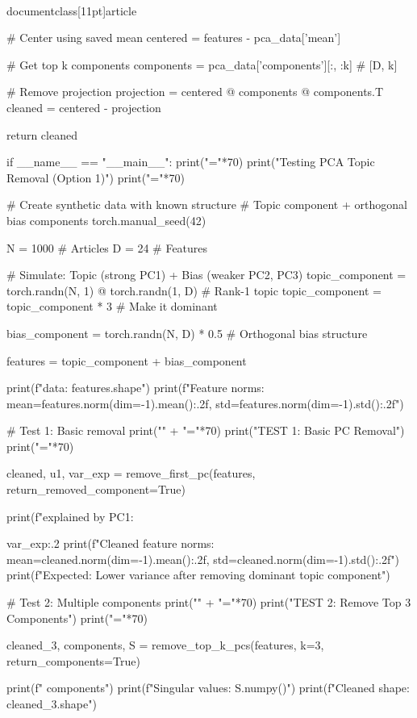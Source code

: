 \\documentclass[11pt]{article}
\begin{document}
\begin{CodeBlock}
{{    # Center using saved mean
    centered = features - pca_data['mean']
    
    # Get top k components
    components = pca_data['components'][:, :k]  # [D, k]
    
    # Remove projection
    projection = centered @ components @ components.T
    cleaned = centered - projection
    
    return cleaned


if __name__ == "__main__":
    print("="*70)
    print("Testing PCA Topic Removal (Option 1)")
    print("="*70)
    
    # Create synthetic data with known structure
    # Topic component + orthogonal bias components
    torch.manual_seed(42)
    
    N = 1000  # Articles
    D = 24    # Features
    
    # Simulate: Topic (strong PC1) + Bias (weaker PC2, PC3)
    topic_component = torch.randn(N, 1) @ torch.randn(1, D)  # Rank-1 topic
    topic_component = topic_component * 3  # Make it dominant
    
    bias_component = torch.randn(N, D) * 0.5  # Orthogonal bias structure
    
    features = topic_component + bias_component
    
    print(f"\nSynthetic data: {features.shape}")
    print(f"Feature norms: mean={features.norm(dim=-1).mean():.2f}, std={features.norm(dim=-1).std():.2f}")
    
    # Test 1: Basic removal
    print("\n" + "="*70)
    print("TEST 1: Basic PC Removal")
    print("="*70)
    
    cleaned, u1, var_exp = remove_first_pc(features, return_removed_component=True)
    
    print(f"\nVariance explained by PC1: {var_exp:.2%
    print(f"Cleaned feature norms: mean={cleaned.norm(dim=-1).mean():.2f}, std={cleaned.norm(dim=-1).std():.2f}")
    print(f"Expected: Lower variance after removing dominant topic component")
    
    # Test 2: Multiple components
    print("\n" + "="*70)
    print("TEST 2: Remove Top 3 Components")
    print("="*70)
    
    cleaned_3, components, S = remove_top_k_pcs(features, k=3, return_components=True)
    
    print(f" components")
    print(f"Singular values: {S.numpy()}")
    print(f"Cleaned shape: {cleaned_3.shape}")
    
}}}
\end{CodeBlock}
\end{document}
